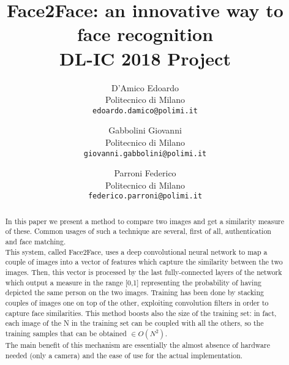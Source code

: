\documentclass[10pt,twocolumn,letterpaper]{article}
\begin{document}
\title{Face2Face: an innovative way to face recognition \\ DL-IC 2018 Project} 

\author{D'Amico Edoardo\\
Politecnico di Milano\\
{\tt\small edoardo.damico@polimi.it}
\and
Gabbolini Giovanni\\
Politecnico di Milano\\
{\tt\small giovanni.gabbolini@polimi.it}
\and
Parroni Federico\\
Politecnico di Milano\\
{\tt\small federico.parroni@polimi.it}
}

\maketitle

\begin{abstract}
In this paper we present a method to compare two images and get a similarity measure of these. Common usages of such a technique are several, first of all, authentication and face matching.
\\
This system, called Face2Face, uses a deep convolutional neural network to map a couple of images into a vector of features which capture the similarity between the two images. Then, this vector is processed by the last fully-connected layers of the network which output a measure in the range [0,1] representing the probability of having depicted the same person on the two images. Training has been done by stacking couples of images one on top of the other, exploiting convolution filters in order to capture face similarities. This method boosts also the size of the training set: in fact, each image of the N in the training set can be coupled with all the others, so the training samples that can be obtained $\in O(N^2)$.
\\
The main benefit of this mechanism are essentially the almost absence of hardware needed (only a camera) and the ease of use for the actual implementation. 
\end{abstract}

\end{document}
